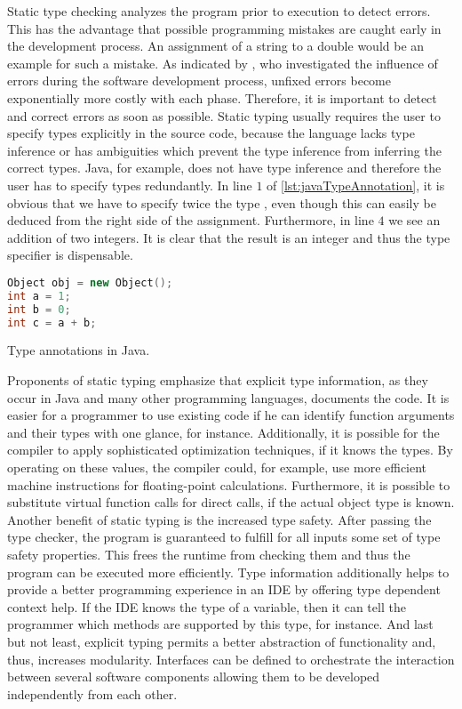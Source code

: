 Static type checking analyzes the program prior to execution to detect errors.
This has the advantage that possible programming mistakes are caught early in the development process.
An assignment of a string to a double would be an example for such a mistake.
As indicated by \textcite{westland:jss2002a}, who investigated the influence of errors during the software development process, unfixed errors become exponentially more costly with each phase.
Therefore, it is important to detect and correct errors as soon as possible.
Static typing usually requires the user to specify types explicitly in the source code, because the language lacks type inference or has ambiguities which prevent the type inference from inferring the correct types.
Java, for example, does not have type inference and therefore the user has to specify types redundantly.
In line $1$ of \cref{lst:javaTypeAnnotation}, it is obvious that we have to specify twice the type , even though this can easily be deduced from the right side of the assignment.
Furthermore, in line $4$ we see an addition of two integers.
It is clear that the result is an integer and thus the  type specifier is dispensable.
\begin{listing}[!h]
	\begin{CenteredBox}
		\begin{lstlisting}[language=C++,
		  commentstyle=\color{black},
		  stringstyle=\color{black},
		  keywordstyle=\color{black}\bfseries,
		  ]
Object obj = new Object();
int a = 1;
int b = 0;
int c = a + b;			
		\end{lstlisting}
	\end{CenteredBox}
	\caption{Type annotations in Java.}
	\label{lst:javaTypeAnnotation}
\end{listing}

Proponents of static typing emphasize that explicit type information, as they occur in Java and many other programming languages, documents the code.
It is easier for a programmer to use existing code if he can identify function arguments and their types with one glance, for instance. 
Additionally, it is possible for the compiler to apply sophisticated optimization techniques, if it knows the types.
By operating on these values, the compiler could, for example, use more efficient machine instructions for floating-point calculations.
Furthermore, it is possible to substitute virtual function calls for direct calls, if the actual object type is known.
Another benefit of static typing is the increased type safety.
After passing the type checker, the program is guaranteed to fulfill for all inputs some set of type safety properties.
This frees the runtime from checking them and thus the program can be executed more efficiently.
Type information additionally helps to provide a better programming experience in an IDE by offering type dependent context help.
If the IDE knows the type of a variable, then it can tell the programmer which methods are supported by this type, for instance.
And last but not least, explicit typing permits a better abstraction of functionality and, thus, increases modularity.
Interfaces can be defined to orchestrate the interaction between several software components allowing them to be developed independently from each other.

